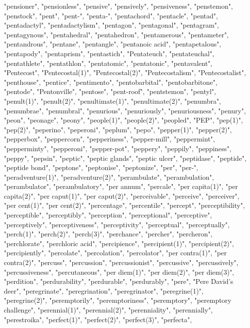 "pensioner",
"pensionless",
"pensive",
"pensively",
"pensiveness",
"penstemon",
"penstock",
"pent",
"pent-",
"penta-",
"pentachord",
"pentacle",
"pentad",
"pentadactyl",
"pentadactylism",
"pentagon",
"pentagonal",
"pentagram",
"pentagynous",
"pentahedral",
"pentahedron",
"pentamerous",
"pentameter",
"pentandrous",
"pentane",
"pentangle",
"pentanoic acid",
"pentapetalous",
"pentapody",
"pentaprism",
"pentastich",
"Pentateuch",
"pentateuchal",
"pentathlete",
"pentathlon",
"pentatomic",
"pentatonic",
"pentavalent",
"Pentecost",
"Pentecostal(1)",
"Pentecostal(2)",
"Pentecostalism",
"Pentecostalist",
"penthouse",
"pentice",
"pentimento",
"pentobarbital",
"pentobarbitone",
"pentode",
"Pentonville",
"pentose",
"pent-roof",
"pentstemon",
"pentyl",
"penult(1)",
"penult(2)",
"penultimate(1)",
"penultimate(2)",
"penumbra",
"penumbrae",
"penumbral",
"penurious",
"penuriously",
"penuriousness",
"penury",
"peon",
"peonage",
"peony",
"people(1)",
"people(2)",
"peopled",
"PEP",
"pep(1)",
"pep(2)",
"peperino",
"peperoni",
"peplum",
"pepo",
"pepper(1)",
"pepper(2)",
"pepperbox",
"peppercorn",
"pepperiness",
"pepper-mill",
"peppermint",
"pepperminty",
"pepperoni",
"pepper-pot",
"peppery",
"peppily",
"peppiness",
"peppy",
"pepsin",
"peptic",
"peptic glands",
"peptic ulcer",
"peptidase",
"peptide",
"peptide bond",
"peptone",
"peptonise",
"peptonize",
"per",
"per-",
"peradventure(1)",
"peradventure(2)",
"perambulate",
"perambulation",
"perambulator",
"perambulatory",
"per annum",
"percale",
"per capita(1)",
"per capita(2)",
"per caput(1)",
"per caput(2)",
"perceivable",
"perceive",
"perceiver",
"per cent(1)",
"per cent(2)",
"percentage",
"percentile",
"percept",
"perceptibility",
"perceptible",
"perceptibly",
"perception",
"perceptional",
"perceptive",
"perceptively",
"perceptiveness",
"perceptivity",
"perceptual",
"perceptually",
"perch(1)",
"perch(2)",
"perch(3)",
"perchance",
"percher",
"percheron",
"perchlorate",
"perchloric acid",
"percipience",
"percipient(1)",
"percipient(2)",
"percipiently",
"percolate",
"percolation",
"percolator",
"per contra(1)",
"per contra(2)",
"percuss",
"percussion",
"percussionist",
"percussive",
"percussively",
"percussiveness",
"percutaneous",
"per diem(1)",
"per diem(2)",
"per diem(3)",
"perdition",
"perdurability",
"perdurable",
"perdurably",
"pere",
"Pere David's deer",
"peregrinate",
"peregrination",
"peregrinator",
"peregrine(1)",
"peregrine(2)",
"peremptorily",
"peremptoriness",
"peremptory",
"peremptory challenge",
"perennial(1)",
"perennial(2)",
"perenniality",
"perennially",
"perestroika",
"perfect(1)",
"perfect(2)",
"perfect(3)",
"perfecta",
